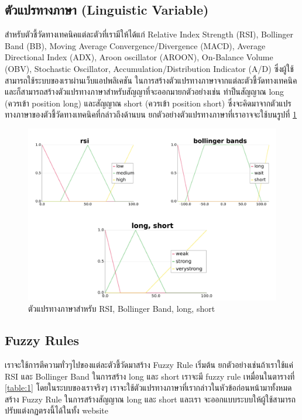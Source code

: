 \subsection{ตัวแปรทางภาษา (Linguistic Variable)}
สำหรับตัวชี้วัดทางเทคนิคแต่ละตัวที่เรามีให้ได้แก่ Relative Index Strength (RSI), Bollinger Band (BB), Moving Average Convergence/Divergence
(MACD), Average Directional Index (ADX), Aroon oscillator (AROON), On-Balance Volume (OBV), Stochastic Oscillator,
Accumulation/Distribution Indicator (A/D) ซึ่งผู้ใช้สามารถใช้ระบบของเราผ่านเว็บแอปพลิเคชัน ในการสร้างตัวแปรทางภาษาจากแต่ละตัวชี้วัดทางเทคนิค
และก็สามารถสร้างตัวแปรทางภาษาสำหรับสัญญาที่จะออกมายกตัวอย่างเช่น ทำป็นสัญญาณ long (ควรเข้า position long) และสัญญาณ short (ควรเข้า position short)
ซึ่งจะคิดมาจากตัวแปรทางภาษาของตัวชี้วัดทางเทคนิคที่กล่าวถึงด้านบน ยกตัวอย่างตัวแปรทางภาษาที่เราอาจจะใช้บนรูปที่ \ref{fig:8}
\begin{figure}[ht]
    \centering
    \includegraphics[width=\textwidth]{images/linguistic.png}
    \caption{ตัวแปรทางภาษาสำหรับ RSI, Bollinger Band, long, short}
    \label{fig:8}
\end{figure}

\subsection{Fuzzy Rules}
เราจะใช้การตีความทั่วๆไปของแต่ละตัวชี้วัดมาสร้าง Fuzzy Rule เริ่มต้น ยกตัวอย่างเช่นถ้าเราใช้แค่ RSI และ Bollinger Band ในการสร้าง long และ short เราจะมี fuzzy rule
เหมื่อนในตารางที่ \ref{table:1} โดยในระบบของเราจริงๆ เราจะใช้ตัวแปรทางภาษาที่เรากล่าวในหัวข้อก่อนหน้ามาทั้งหมดสร้าง Fuzzy Rule ในการสร้างสัญญาณ long และ short และเรา
จะออกแบบระบบให้ผู้ใช้สามารถปรับแต่งกฏตรงนี้ได้ในทั้ง website

